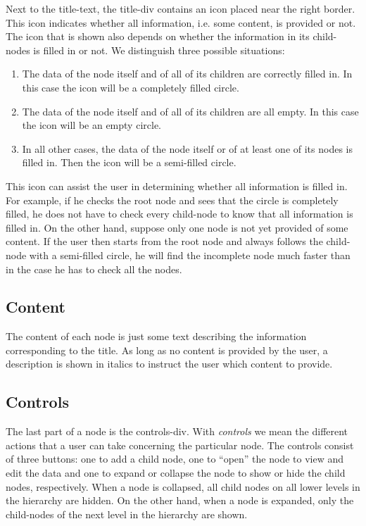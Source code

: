 Next to the title-text, the title-div contains an icon placed near the right border. This icon indicates whether all information, i.e. some content, is provided or not. The icon that is shown also depends on whether the information in its child-nodes is filled in or not. We distinguish three possible situations:
\begin{enumerate}
	\item The data of the node itself and of all of its children are correctly filled in. In this case the icon will be a completely filled circle.
	\item The data of the node itself and of all of its children are all empty. In this case the icon will be an empty circle.
	\item In all other cases, the data of the node itself or of at least one of its nodes is filled in. Then the icon will be a semi-filled circle.
\end{enumerate}
This icon can assist the user in determining whether all information is filled in. For example, if he checks the root node and sees that the circle is completely filled, he does not have to check every child-node to know that all information is filled in. On the other hand, suppose only one node is not yet provided of some content. If the user then starts from the root node and always follows the child-node with a semi-filled circle, he will find the incomplete node much faster than in the case he has to check all the nodes.



\subsection{Content}
The content of each node is just some text describing the information corresponding to the title. As long as no content is provided by the user, a description is shown in italics to instruct the user which content to provide.



\subsection{Controls}
The last part of a node is the controls-div. With \textit{controls} we mean the different actions that a user can take concerning the particular node. The controls consist of three buttons: one to add a child node, one to ``open'' the node to view and edit the data and one to expand or collapse the node to show or hide the child nodes, respectively. When a node is collapsed, all child nodes on all lower levels in the hierarchy are hidden. On the other hand, when a node is expanded, only the child-nodes of the next level in the hierarchy are shown.



